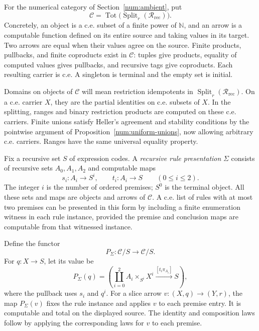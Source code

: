 \documentclass[11pt]{article}
\theoremstyle{definition}
\theoremstyle{remark}
\newcommand{\R}{\mathscr R}
\newcommand{\Tot}{\operatorname{Tot}}
\newcommand{\N}{\mathbb N}
\begin{document}
For the numerical category of Section~\ref{num:ambient}, put
\[
 \mathscr C=
 \Tot\bigl(\operatorname{Split}_r(\R_{\mathrm{rec}})\bigr).
\]
Concretely, an object is a c.e. subset of a finite power of $\N$, and
an arrow is a computable function defined on its entire source and
taking values in its target. Two arrows are equal when their values
agree on the source. Finite products, pullbacks, and finite coproducts
exist in $\mathscr C$: tuples give products, equality of computed
values gives pullbacks, and recursive tags give coproducts. Each
resulting carrier is c.e. A singleton is terminal and the empty set is
initial.

Domains on objects of $\mathscr C$ will mean restriction idempotents
in $\operatorname{Split}_r(\R_{\mathrm{rec}})$. On a c.e. carrier
$X$, they are the partial identities on c.e. subsets of $X$.
In the splitting, ranges and binary restriction products are computed
on these c.e. carriers. Finite unions satisfy Heller's agreement and
stability conditions by the pointwise argument of
Proposition~\ref{num:uniform-unions}, now allowing arbitrary c.e.
carriers. Ranges have the same universal equality property.

Fix a recursive set $S$ of expression codes. A \emph{recursive rule
presentation} $\Sigma$ consists of recursive sets $A_0,A_1,A_2$ and
computable maps
\[
 s_i:A_i\longrightarrow S^i,\qquad
 t_i:A_i\longrightarrow S\qquad(0\le i\le2).
\]
The integer $i$ is the number of ordered premises; $S^0$ is the
terminal object. All these sets and maps are objects and arrows of
$\mathscr C$. A c.e. list of rules with at most two premises can be
presented in this form by
including a finite enumeration witness in each rule instance, provided
the premise and conclusion maps are computable from that witnessed
instance.

Define the functor
\begin{equation}\label{poly:slice-type}
 P_\Sigma:\mathscr C/S\longrightarrow\mathscr C/S.
\end{equation}
For $q:X\to S$, let its value be
\begin{equation}\label{poly:slice-formula}
 P_\Sigma(q)=
 \left(
 \coprod_{i=0}^{2}A_i\times_{S^i}X^i
 \xrightarrow{[t_i\pi_{A_i}]}S
 \right),
\end{equation}
where the pullback uses $s_i$ and $q^i$. For a slice arrow
$v:(X,q)\to(Y,r)$, the map $P_\Sigma(v)$ fixes the rule instance and
applies $v$ to each premise entry. It is computable and total on the
displayed source. The identity and composition laws follow by applying
the corresponding laws for $v$ to each premise.
\end{document}
